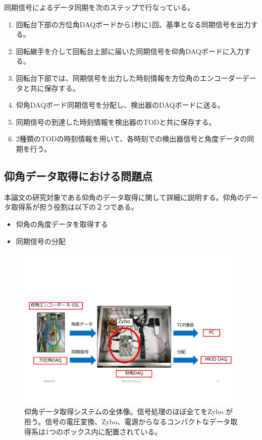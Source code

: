 同期信号によるデータ同期を次のステップで行なっている。
\begin{enumerate}
  \item 回転台下部の方位角DAQボードから1秒に1回、基準となる同期信号を出力する。
  \item 回転継手を介して回転台上部に届いた同期信号を仰角DAQボードに入力する。
  \item 回転台下部では、同期信号を出力した時刻情報を方位角のエンコーダーデータと共に保存する。
  \item 仰角DAQボード同期信号を分配し、検出器のDAQボードに送る。
  \item 同期信号の到達した時刻情報を検出器のTODと共に保存する。
  \item 2種類のTODの時刻情報を用いて、各時刻での検出器信号と角度データの同期を行う。
\end{enumerate}

\subsection{仰角データ取得における問題点}
本論文の研究対象である仰角のデータ取得に関して詳細に説明する。仰角のデータ取得系が担う役割は以下の２つである。
\begin{itemize}
  \item 仰角の角度データを取得する
  \item 同期信号の分配
\end{itemize}

\begin{figure}[htbp]
  \centering
  \includegraphics[width=1.0\columnwidth]{4_elDAQ/figs/GB_DAQ_box_mod.pdf}
  \caption{仰角データ取得システムの全体像。信号処理のほぼ全てをZybo \cite{Zybo}が担う。信号の電圧変換、Zybo、電源からなるコンパクトなデータ取得系は1つのボックス内に配置されている。}
  \label{GB_daq_box}
\end{figure}

